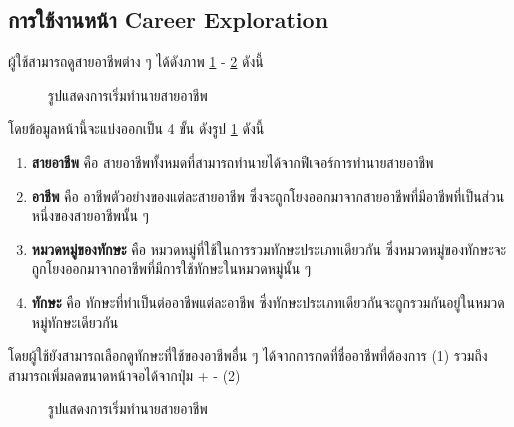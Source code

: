 \subsection{การใช้งานหน้า Career Exploration}
ผู้ใช้สามารถดูสายอาชีพต่าง ๆ ได้ดังภาพ \ref{fig:info-CE} - \ref{fig:home-CE} ดังนี้
\begin{figure}[H]\centering
    \caption{รูปแสดงการเริ่มทำนายสายอาชีพ}\label{fig:info-CE}
\end{figure}
โดยข้อมูลหน้านี้จะแบ่งออกเป็น 4 ขั้น ดังรูป \ref{fig:info-CE} ดังนี้
\begin{enumerate}
    \item \textbf{สายอาชีพ} คือ สายอาชีพทั้งหมดที่สามารถทำนายได้จากฟีเจอร์การทำนายสายอาชีพ
    \item \textbf{อาชีพ} คือ อาชีพตัวอย่างของแต่ละสายอาชีพ ซึ่งจะถูกโยงออกมาจากสายอาชีพที่มีอาชีพที่เป็นส่วนหนึ่งของสายอาชีพนั้น ๆ
    \item \textbf{หมวดหมู่ของทักษะ} คือ หมวดหมู่ที่ใช้ในการรวมทักษะประเภทเดียวกัน ซึ่งหมวดหมู่ของทักษะจะถูกโยงออกมาจากอาชีพที่มีการใช้ทักษะในหมวดหมู่นั้น ๆ 
    \item \textbf{ทักษะ} คือ ทักษะที่ทำเป็นต่ออาชีพแต่ละอาชีพ ซึ่งทักษะประเภทเดียวกันจะถูกรวมกันอยู่ในหมวดหมู่ทักษะเดียวกัน
\end{enumerate}

โดยผู้ใช้ยังสามารถเลือกดูทักษะที่ใช้ของอาชีพอื่น ๆ ได้จากการกดที่ชื่ออาชีพที่ต้องการ (1) รวมถึงสามารถเพิ่มลดขนาดหน้าจอได้จากปุ่ม + - (2)
\begin{figure}[H]\centering
    \caption{รูปแสดงการเริ่มทำนายสายอาชีพ}\label{fig:home-CE}
\end{figure}